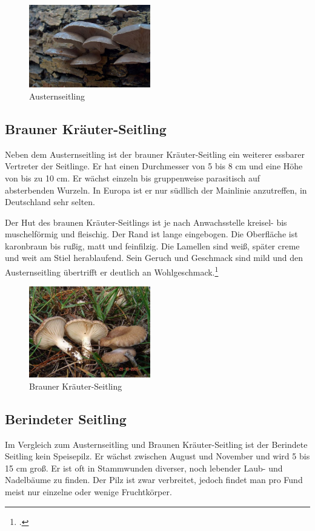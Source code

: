 \documentclass[a4paper,abstracton]{scrreprt}
\begin{document}
\begin{figure}[H]
\centering
\includegraphics[width=200px]{auster2}
\caption{Austernseitling\protect\footnotemark}
\label{fig:austernseitling}
\end{figure}

\subsection{Brauner Kräuter-Seitling}
Neben dem Austernseitling ist der brauner Kräuter-Seitling ein weiterer essbarer Vertreter der Seitlinge. Er hat einen Durchmesser von 5 bis 8 cm und eine Höhe von bis zu 10 cm. Er wächst einzeln bis gruppenweise parasitisch auf absterbenden Wurzeln. In Europa ist er nur südllich der Mainlinie anzutreffen, in Deutschland sehr selten.

Der Hut des braunen Kräuter-Seitlings ist je nach Anwachsstelle kreisel- bis muschelförmig und fleischig. Der Rand ist lange eingebogen. Die Oberfläche ist karonbraun bis rußig, matt und feinfilzig. Die Lamellen sind weiß, später creme und weit am Stiel herablaufend. Sein Geruch und Geschmack sind mild und den Austernseitling übertrifft er deutlich an Wohlgeschmack.\footcite{tintling_kraeuter}

\begin{figure}[H]
\centering
\includegraphics[width=200px]{kraeuterseitling}
\caption{Brauner Kräuter-Seitling\protect\footnotemark}
\label{fig:kraeuterseitling}
\end{figure}

\subsection{Berindeter Seitling}
Im Vergleich zum Austernseitling und Braunen Kräuter-Seitling ist der Berindete Seitling kein Speisepilz. Er wächst zwischen August und November und wird 5 bis 15 cm groß. Er ist oft in Stammwunden diverser, noch lebender Laub- und Nadelbäume zu finden. Der Pilz ist zwar verbreitet, jedoch findet man pro Fund meist nur einzelne oder wenige Fruchtkörper.
\end{document}
